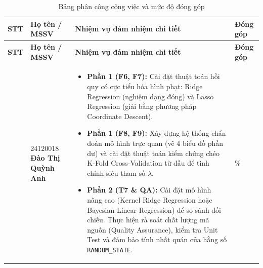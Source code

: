 \renewcommand{\arraystretch}{1.5}
\begin{longtable}{|p{}|p{}|>{\linespread{1.3}\selectfont\arraybackslash}p{}|p{}|}
    
    \caption{Bảng phân công công việc và mức độ đóng góp} \\
    
    \hline
    \centering \textbf{STT} & \textbf{Họ tên / MSSV} & \textbf{Nhiệm vụ đảm nhiệm chi tiết} & \textbf{Đóng góp} \\ \hline
    \endfirsthead
    
    \hline
    \centering \textbf{STT} & \textbf{Họ tên / MSSV} & \textbf{Nhiệm vụ đảm nhiệm chi tiết} & \textbf{Đóng góp} \\ \hline
    \endhead
    
    \hline
    \endfoot
    
    \hline
    \endlastfoot

    
    \centering 1 & 
    24120018 \newline \textbf{Đào Thị Quỳnh Anh} & 
    \vspace{-0.4cm}
    \begin{itemize}[itemsep=0.15cm, topsep=0cm, partopsep=0cm]
        \item \textbf{Phần 1 (F6, F7):} Cài đặt thuật toán hồi quy có cực tiểu hóa hình phạt: Ridge Regression (nghiệm dạng đóng) và Lasso Regression (giải bằng phương pháp Coordinate Descent).
        \item \textbf{Phần 1 (F8, F9):} Xây dựng hệ thống chẩn đoán mô hình trực quan (vẽ 4 biểu đồ phần dư) và cài đặt thuật toán kiểm chứng chéo K-Fold Cross-Validation từ đầu để tinh chỉnh siêu tham số $\lambda$.
        \item \textbf{Phần 2 (T7 \& QA):} Cài đặt mô hình nâng cao (Kernel Ridge Regression hoặc Bayesian Linear Regression) để so sánh đối chiếu. Thực hiện rà soát chất lượng mã nguồn (Quality Assurance), kiểm tra Unit Test và đảm bảo tính nhất quán của hằng số \texttt{RANDOM\_STATE}.
    \end{itemize} \vspace{-0.2cm} & 
    \centering 100\% \tabularnewline \hline
    

\end{longtable}
